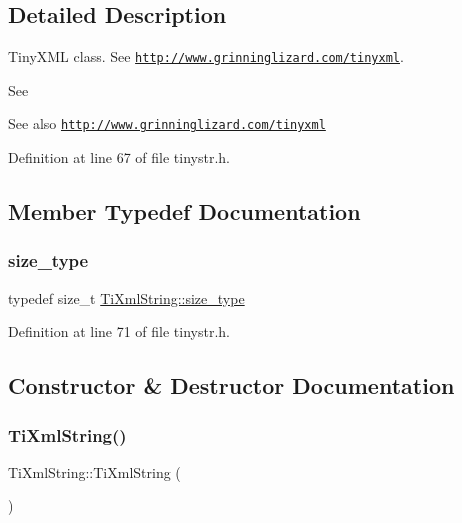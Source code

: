 \subsection{Detailed Description}
Tiny\+X\+ML class. See \href{http://www.grinninglizard.com/tinyxml}{\tt http\+://www.\+grinninglizard.\+com/tinyxml}. 

See \begin{DoxySeeAlso}{See also}
\href{http://www.grinninglizard.com/tinyxml}{\tt http\+://www.\+grinninglizard.\+com/tinyxml} 
\end{DoxySeeAlso}


Definition at line 67 of file tinystr.\+h.



\subsection{Member Typedef Documentation}
\hypertarget{class_ti_xml_string_abeb2c1893a04c17904f7c06546d0b971}{}\label{class_ti_xml_string_abeb2c1893a04c17904f7c06546d0b971} 
\subsubsection{\texorpdfstring{size\+\_\+type}{size\_type}}
{\footnotesize\ttfamily typedef size\+\_\+t \hyperlink{class_ti_xml_string_abeb2c1893a04c17904f7c06546d0b971}{Ti\+Xml\+String\+::size\+\_\+type}}



Definition at line 71 of file tinystr.\+h.



\subsection{Constructor \& Destructor Documentation}
\hypertarget{class_ti_xml_string_a342f61e0fc2244df300b73aedf6d3fef}{}\label{class_ti_xml_string_a342f61e0fc2244df300b73aedf6d3fef} 
\subsubsection{\texorpdfstring{Ti\+Xml\+String()}{TiXmlString()}\hspace{0.1cm}{\footnotesize\ttfamily [1/4]}}
{\footnotesize\ttfamily Ti\+Xml\+String\+::\+Ti\+Xml\+String (\begin{DoxyParamCaption}{ }\end{DoxyParamCaption})\hspace{0.3cm}{\ttfamily [inline]}}



